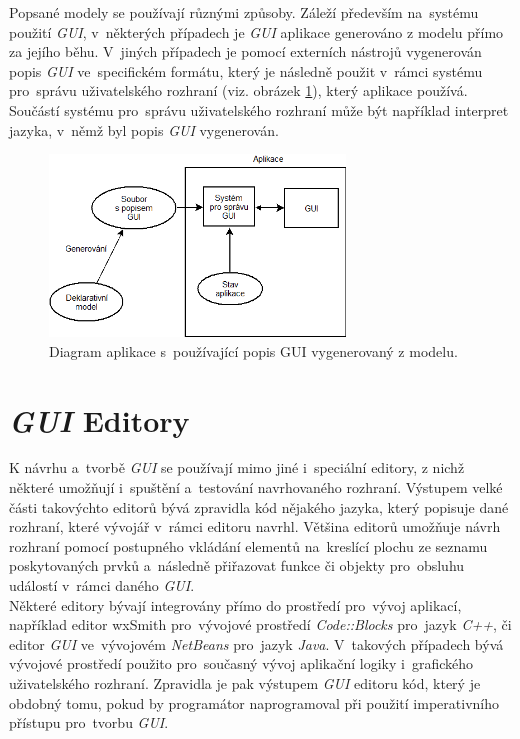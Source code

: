 \documentclass[11pt,twoside,a4paper]{book}
\begin{document}
Popsané modely se používají různými způsoby. Záleží především na~systému použití \textit{GUI}, v~některých případech je \textit{GUI} aplikace generováno z modelu přímo za jejího běhu. V~jiných případech je pomocí externích nástrojů vygenerován popis \textit{GUI} ve~specifickém formátu, který je následně použit v~rámci systému pro~správu uživatelského rozhraní (viz. obrázek \ref{fig:modelUse}), který aplikace používá. Součástí systému pro~správu uživatelského rozhraní může být například interpret jazyka, v~němž byl popis \textit{GUI} vygenerován. \cite{bib:model}\\

\begin{figure}[!ht]
\begin{center}
  \includegraphics[width=0.7\textwidth]{modelUse}
\caption{{\label{fig:modelUse}}Diagram aplikace s~používající popis GUI vygenerovaný z modelu.}
\end{center}
\end{figure}

\section{\label{SEC:editGUI}\textit{GUI} Editory}
K návrhu a~tvorbě \textit{GUI} se používají mimo jiné i~speciální editory, z nichž některé umožňují i~spuštění a~testování navrhovaného rozhraní. Výstupem velké části takovýchto editorů bývá zpravidla kód nějakého jazyka, který popisuje dané rozhraní, které vývojář v~rámci editoru navrhl. Většina editorů umožňuje návrh rozhraní pomocí postupného vkládání elementů na~kreslící plochu ze seznamu poskytovaných prvků a~následně přiřazovat funkce či objekty pro~obsluhu událostí v~rámci daného \textit{GUI}.\\
Některé editory bývají integrovány přímo do prostředí pro~vývoj aplikací, například editor wxSmith pro~vývojové prostředí \textit{Code::Blocks} pro~jazyk \textit{C++}, či editor \textit{GUI} ve~vývojovém \textit{NetBeans} pro~jazyk \textit{Java}. V~takových případech bývá vývojové prostředí použito pro~současný vývoj aplikační logiky i~grafického uživatelského rozhraní. Zpravidla je pak výstupem \textit{GUI} editoru kód, který je obdobný tomu, pokud by programátor naprogramoval při použití imperativního přístupu pro~tvorbu \textit{GUI}.
\end{document}
